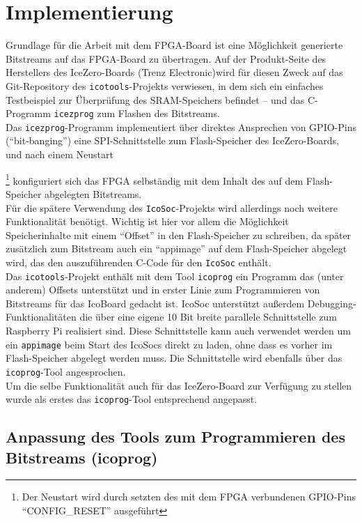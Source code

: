 \chapter{Implementierung}
\label{ch:Implementierung}

Grundlage für die Arbeit mit dem FPGA-Board ist eine Möglichkeit generierte Bitstreams auf das FPGA-Board zu übertragen.
Auf der Produkt-Seite des Herstellers des IceZero-Boards (Trenz Electronic)\cite{web:trenz_icezero}wird für diesen Zweck auf das Git-Repository des {\tt icotools}-Projekts verwiesen, in dem sich ein einfaches Testbeispiel zur Überprüfung des SRAM-Speichers befindet -- und das C-Programm {\tt icezprog} zum Flashen des Bitstreams.\\
Das {\tt icezprog}-Programm implementiert über direktes Ansprechen von GPIO-Pins (``bit-banging'') eine SPI-Schnittstelle zum Flash-Speicher des IceZero-Boards, und nach einem Neustart{\footnote{Der Neustart wird durch setzten des mit dem FPGA verbundenen GPIO-Pins ``CONFIG\_RESET'' ausgeführt} konfiguriert sich das FPGA selbständig mit dem Inhalt des auf dem Flash-Speicher abgelegten Bitstreams.\\
Für die spätere Verwendung des {\tt IcoSoc}-Projekts wird allerdings noch weitere Funktionalität benötigt. Wichtig ist hier vor allem die Möglichkeit Speicherinhalte mit einem ``Offset'' in den Flash-Speicher zu schreiben, da später zusätzlich zum Bitstream auch ein ``appimage'' auf dem Flash-Speicher abgelegt wird, das den auszuführenden C-Code für den {\tt IcoSoc} enthält.\\
Das {\tt icotools}-Projekt enthält mit dem Tool {\tt icoprog} ein Programm das (unter anderem) Offsets unterstützt und in erster Linie zum Programmieren von Bitstreams für das IcoBoard gedacht ist. IcoSoc unterstützt außerdem Debugging-Funktionalitäten die über eine eigene 10 Bit breite parallele Schnittstelle zum Raspberry Pi realisiert sind. Diese Schnittstelle kann auch verwendet werden um ein {\tt appimage} beim Start des IcoSocs direkt zu laden, ohne dass es vorher im Flash-Speicher abgelegt werden muss. Die Schnittstelle wird ebenfalls über das {\tt icoprog}-Tool angesprochen.\\
Um die selbe Funktionalität auch für das IceZero-Board zur Verfügung zu stellen wurde als erstes das {\tt icoprog}-Tool entsprechend angepasst. 

\section{Anpassung des Tools zum Programmieren des Bitstreams (icoprog)}
\label{ch:Implementierung:sec:icoprog}

}
